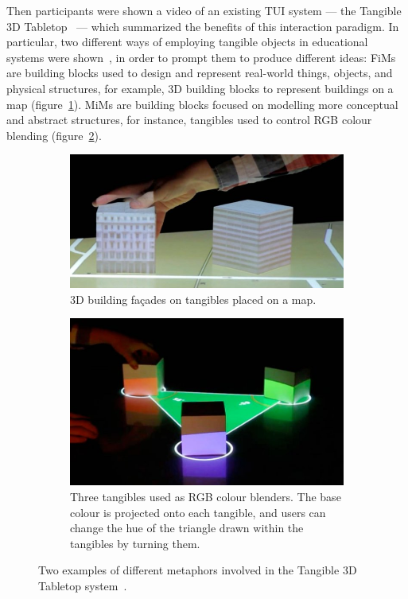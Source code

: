 Then participants were shown a video of an existing \ac{TUI} system --- the Tangible 3D Tabletop~\cite{Dalsgaard:2014ut} --- which summarized the benefits of this interaction paradigm. In particular, two different ways of employing tangible objects in educational systems were shown~\cite{Zuckerman:2005:ETI:1054972.1055093}, in order to prompt them to produce different ideas: \acp{FiM} are building blocks used to design and represent real-world things, objects, and physical structures, for example, 3D building blocks to represent buildings on a map (figure~\ref{fig:tangible:a}). \acp{MiM} are building blocks focused on modelling more conceptual and abstract structures, for instance, tangibles used to control RGB colour blending (figure~\ref{fig:tangible:b}).

\begin{figure}[ht!] 
  \begin{subfigure}[b]{0.48\linewidth}
    \centering
    \includegraphics[width=0.75\linewidth]{images/c4/BuildingTangible.jpg} 
    \caption{3D building fa\c{c}ades on tangibles placed on a map.}\label{fig:tangible:a}
    \vspace{6ex}
  \end{subfigure}
  \begin{subfigure}[b]{0.48\linewidth}
    \centering
    \includegraphics[width=0.75\linewidth]{images/c4/RGBTangible.jpg} 
    \caption{Three tangibles used as RGB colour blenders. The base colour is projected onto each tangible, and users can change the hue of the triangle drawn within the tangibles by turning them.}\label{fig:tangible:b}
  \end{subfigure}
  \caption{Two examples of different metaphors involved in the Tangible 3D Tabletop system~\cite{Dalsgaard:2014ut}.}\label{fig:tangible}
\end{figure}


